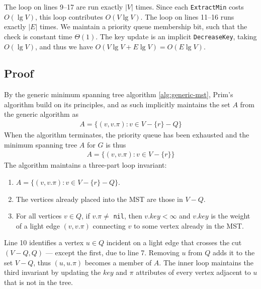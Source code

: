 The loop on lines 9--17 are run exactly $|V|$ times. Since each
\texttt{ExtractMin} costs $O(\lg V)$, this loop contributes $O(V \lg V)$. The
loop on lines 11--16 runs exactly $|E|$ times. We maintain a priority queue
membership bit, such that the check is constant time $\Theta(1)$. The key
update is an implicit \texttt{DecreaseKey}, taking $O(\lg V)$, and thus we
have $O(V \lg V + E \lg V) = O(E \lg V)$.

\subsection{Proof}
By the generic minimum spanning tree algorithm \ref{alg:generic-mst}, Prim's
algorithm build on its principles, and as such implicitly maintains the set
$A$ from the generic algorithm as
\begin{align}
	A = \{ (v, v.\pi) : v \in V - \{r\} - Q \}
\end{align}
When the algorithm terminates, the priority queue has been exhausted and the
minimum spanning tree $A$ for $G$ is thus
\begin{align}
	A = \{ (v, v.\pi) : v \in V - \{r\} \}
\end{align}
The algorithm maintains a three-part loop invariant:
\begin{enumerate}
	\item $A = \{ (v, v.\pi) : v \in V - \{r\} - Q \}$.
	\item The vertices already placed into the MST are those in $V - Q$.
	\item For all vertices $v \in Q$, if $v.\pi \neq $ \texttt{nil}, then
$v.key < \infty$ and $v.key$ is the weight of a light edge $(v, v.\pi)$
connecting $v$ to some vertex already in the MST.
\end{enumerate}
Line 10 identifies a vertex $u \in Q$ incident on a light edge that crosses
the cut $(V - Q, Q)$ --- except the first, due to line 7. Removing $u$ from
$Q$ adds it to the set $V - Q$, thus $(u, u.\pi)$ becomes a member of $A$.
The inner loop maintains the third invariant by updating the $key$ and $\pi$
attributes of every vertex adjacent to $u$ that is not in the tree.
